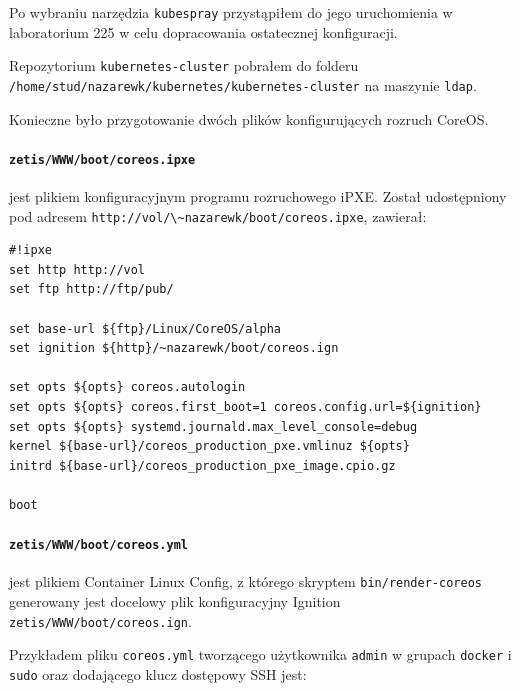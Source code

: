 \documentclass[a4paper,12pt,twoside,openany]{report}
\newcommand{\passthrough}[1]{#1}
\begin{document}
Po wybraniu narzędzia \passthrough{\lstinline!kubespray!} przystąpiłem
do jego uruchomienia w laboratorium 225 w celu dopracowania ostatecznej
konfiguracji.

Repozytorium \passthrough{\lstinline!kubernetes-cluster!} pobrałem do
folderu
\passthrough{\lstinline!/home/stud/nazarewk/kubernetes/kubernetes-cluster!}
na maszynie \passthrough{\lstinline!ldap!}.

Konieczne było przygotowanie dwóch plików konfigurujących rozruch
CoreOS.

\hypertarget{zetiswwwbootcoreos.ipxe}{%
\paragraph{\texorpdfstring{\texttt{zetis/WWW/boot/coreos.ipxe}}{zetis/WWW/boot/coreos.ipxe}}\label{zetiswwwbootcoreos.ipxe}}

jest plikiem konfiguracyjnym programu rozruchowego iPXE. Został
udostępniony pod adresem
\passthrough{\lstinline!http://vol/\~nazarewk/boot/coreos.ipxe!},
zawierał:

\begin{lstlisting}
#!ipxe
set http http://vol
set ftp http://ftp/pub/

set base-url ${ftp}/Linux/CoreOS/alpha
set ignition ${http}/~nazarewk/boot/coreos.ign

set opts ${opts} coreos.autologin
set opts ${opts} coreos.first_boot=1 coreos.config.url=${ignition}
set opts ${opts} systemd.journald.max_level_console=debug
kernel ${base-url}/coreos_production_pxe.vmlinuz ${opts}
initrd ${base-url}/coreos_production_pxe_image.cpio.gz

boot
\end{lstlisting}

\hypertarget{zetiswwwbootcoreos.yml}{%
\paragraph{\texorpdfstring{\texttt{zetis/WWW/boot/coreos.yml}}{zetis/WWW/boot/coreos.yml}}\label{zetiswwwbootcoreos.yml}}

jest plikiem Container Linux Config, z którego skryptem
\passthrough{\lstinline!bin/render-coreos!} generowany jest docelowy
plik konfiguracyjny Ignition
\passthrough{\lstinline!zetis/WWW/boot/coreos.ign!}.

Przykładem pliku \passthrough{\lstinline!coreos.yml!} tworzącego
użytkownika \passthrough{\lstinline!admin!} w grupach
\passthrough{\lstinline!docker!} i \passthrough{\lstinline!sudo!} oraz
dodającego klucz dostępowy SSH jest:
\end{document}
